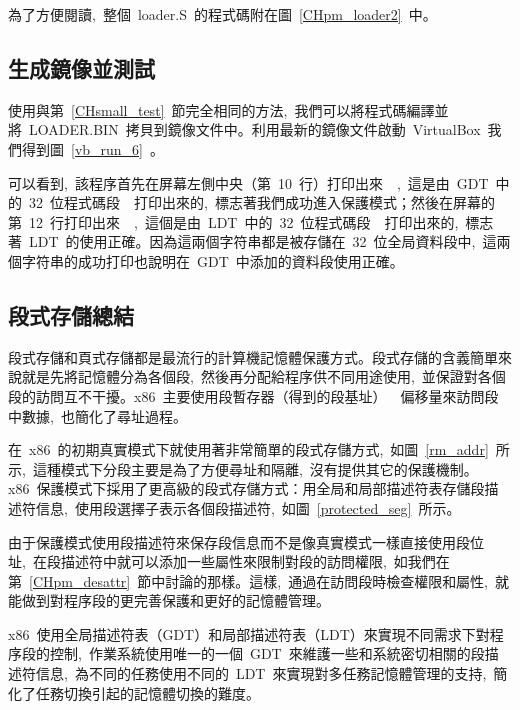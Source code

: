 為了方便閱讀,~整個~loader.S~的程式碼附在圖~\ref{CHpm_loader2}~中。

\label{CHpm_loader2}

\subsection{生成鏡像並測試}

使用與第~\ref{CHsmall_test}~節完全相同的方法,~我們可以將程式碼編譯並將~LOADER.BIN~拷貝到鏡像文件中。利用最新的鏡像文件啟動~VirtualBox~我們得到圖~\ref{vb_run_6}~。


可以看到,~該程序首先在屏幕左側中央（第~10~行）打印出來~~,~這是由~GDT~中的~32~位程式碼段~~打印出來的,~標志著我們成功進入保護模式；然後在屏幕的第~12~行打印出來~~,~這個是由~LDT~中的~32~位程式碼段~~打印出來的,~標志著~LDT~的使用正確。因為這兩個字符串都是被存儲在~32~位全局資料段中,~這兩個字符串的成功打印也說明在~GDT~中添加的資料段使用正確。

\subsection{段式存儲總結}

段式存儲和頁式存儲都是最流行的計算機記憶體保護方式。段式存儲的含義簡單來說就是先將記憶體分為各個段,~然後再分配給程序供不同用途使用,~並保證對各個段的訪問互不干擾。x86~主要使用段暫存器（得到的段基址）~\code{+}~偏移量來訪問段中數據,~也簡化了尋址過程。

在~x86~的初期真實模式下就使用著非常簡單的段式存儲方式,~如圖~\ref{rm_addr}~所示,~這種模式下分段主要是為了方便尋址和隔離,~沒有提供其它的保護機制。x86~保護模式下採用了更高級的段式存儲方式：用全局和局部描述符表存儲段描述符信息,~使用段選擇子表示各個段描述符,~如圖~\ref{protected_seg}~所示。

由于保護模式使用段描述符來保存段信息而不是像真實模式一樣直接使用段位址,~在段描述符中就可以添加一些屬性來限制對段的訪問權限,~如我們在第~\ref{CHpm_desattr}~節中討論的那樣。這樣,~通過在訪問段時檢查權限和屬性,~就能做到對程序段的更完善保護和更好的記憶體管理。

x86~使用全局描述符表（GDT）和局部描述符表（LDT）來實現不同需求下對程序段的控制,~作業系統使用唯一的一個~GDT~來維護一些和系統密切相關的段描述符信息,~為不同的任務使用不同的~LDT~來實現對多任務記憶體管理的支持,~簡化了任務切換引起的記憶體切換的難度。

